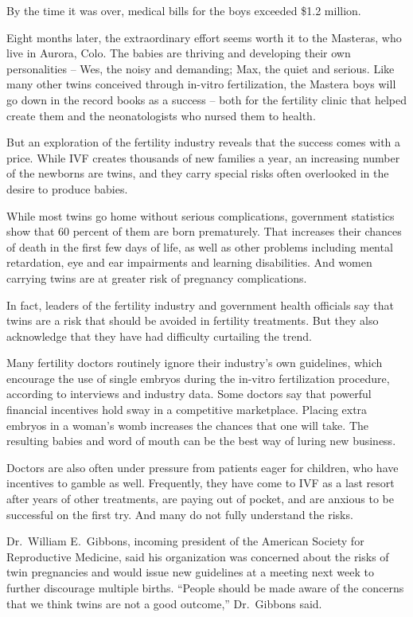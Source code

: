 ﻿\documentclass[12pt]{article}
\begin{document}
By the time it was over, medical bills for the boys exceeded \$1.2 million.

Eight months later, the extraordinary effort seems worth it to the Masteras, who live in Aurora,
Colo. The babies are thriving and developing their own personalities -- Wes, the noisy and
demanding; Max, the quiet and serious. Like many other twins conceived through in-vitro
fertilization, the Mastera boys will go down in the record books as a success -- both for the
fertility clinic that helped create them and the neonatologists who nursed them to health.

But an exploration of the fertility industry reveals that the success comes with a price. While IVF
creates thousands of new families a year, an increasing number of the newborns are twins, and they
carry special risks often overlooked in the desire to produce babies.

While most twins go home without serious complications, government statistics show that 60 percent
of them are born prematurely. That increases their chances of death in the first few days of life,
as well as other problems including mental retardation, eye and ear impairments and learning
disabilities. And women carrying twins are at greater risk of pregnancy complications.

In fact, leaders of the fertility industry and government health officials say that twins are a risk
that should be avoided in fertility treatments. But they also acknowledge that they have had
difficulty curtailing the trend.

Many fertility doctors routinely ignore their industry's own guidelines, which encourage the use of
single embryos during the in-vitro fertilization procedure, according to interviews and industry
data. Some doctors say that powerful financial incentives hold sway in a competitive marketplace.
Placing extra embryos in a woman's womb increases the chances that one will take. The resulting
babies and word of mouth can be the best way of luring new business.

Doctors are also often under pressure from patients eager for children, who have incentives to
gamble as well. Frequently, they have come to IVF as a last resort after years of other treatments,
are paying out of pocket, and are anxious to be successful on the first try. And many do not fully
understand the risks.

Dr.~William E.~Gibbons, incoming president of the American Society for Reproductive Medicine, said
his organization was concerned about the risks of twin pregnancies and would issue new guidelines at
a meeting next week to further discourage multiple births. ``People should be made aware of the
concerns that we think twins are not a good outcome,'' Dr.~Gibbons said.
\end{document}
